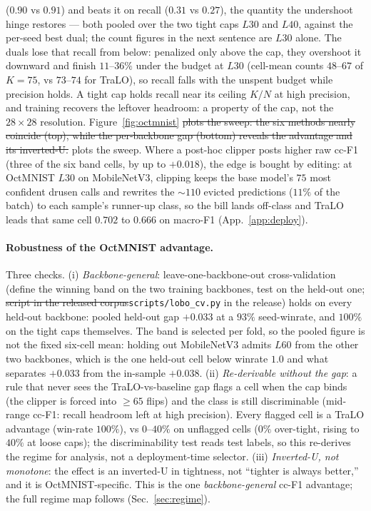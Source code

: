 \documentclass[10pt]{article}
\newcommand{\del}[1]{{\color{red}\sout{#1}}}
\begin{document}
($0.90$ vs $0.91$) and beats it on recall ($0.31$ vs $0.27$), the quantity
the undershoot hinge restores{\color{blue} --- both pooled over the two tight
caps $L30$ and $L40$, against the per-seed best dual; the count figures in the
next sentence are $L30$ alone}. The duals lose that recall from below:
penalized only above the cap, they overshoot it downward and finish
$11$--$36\%$ under the budget at $L30$ (cell-mean counts $48$--$67$ of
$K{=}75$, vs $73$--$74$ for TraLO), so recall falls with the unspent
budget while precision holds. A tight cap holds recall near its ceiling
$K/N$ at high precision, and training recovers the leftover headroom: a
property of the cap, not the $28{\times}28$ resolution. Figure~\ref{fig:octmnist}\del{
plots the sweep: the six methods nearly coincide (top), while the
per-backbone gap (bottom) reveals the advantage and its inverted-U.}%
{\color{blue} plots the sweep.} Where a
post-hoc clipper posts higher raw cc-F1 (three of the six band cells, by
up to $+0.018$), the edge is bought by editing: at OctMNIST $L30$ on
MobileNetV3, clipping keeps the base model's $75$ most confident drusen
calls and rewrites the ${\sim}110$ evicted predictions ($11\%$ of the
batch) to each sample's runner-up class, so the bill lands off-class and
TraLO leads that same cell $0.702$ to $0.666$ on macro-F1
(App.~\ref{app:deploy}).

\paragraph{Robustness of the OctMNIST advantage.}
Three checks. (i) \emph{Backbone-general}: leave-one-backbone-out
cross-validation (define the winning band on the two training backbones,
test on the held-out one; \del{script in the released corpus}{\color{blue}\texttt{scripts/lobo\_cv.py}
in the release}) holds on every
held-out backbone: pooled held-out gap $+0.033$ at a $93\%$ seed-winrate,
and $100\%$ on the tight caps themselves{\color{blue}. The band is selected per
fold, so the pooled figure is not the fixed six-cell mean: holding out
MobileNetV3 admits $L60$ from the other two backbones, which is the one
held-out cell below winrate $1.0$ and what separates $+0.033$ from the
in-sample $+0.038$}. (ii) \emph{Re-derivable without
the gap}: a rule that never sees the TraLO-vs-baseline gap flags a cell
when the cap binds (the clipper is forced into $\ge 65$ flips) and the
class is still discriminable (mid-range cc-F1: recall headroom left at
high precision). Every flagged cell is a TraLO advantage
(win-rate $100\%$), vs $0$--$40\%$ on unflagged cells ($0\%$ over-tight,
rising to $40\%$ at loose caps); the discriminability test reads test
labels, so this re-derives the regime for analysis, not a deployment-time
selector. (iii) \emph{Inverted-U, not monotone}: the effect is an
inverted-U in tightness, not ``tighter is always better,'' and it is
OctMNIST-specific. This is the one \emph{backbone-general} cc-F1
advantage; the full regime map follows (Sec.~\ref{sec:regime}).
\end{document}
